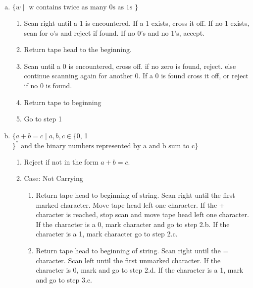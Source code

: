 ﻿\documentclass{article}
\begin{document}
\begin{enumerate}[a)]

\item $\{w \;|\; \text{ w contains twice as many 0s as 1s } \}$

\begin{enumerate}[1)]
\item Scan right until a 1 is encountered. If a 1 exists, cross it off. If no 1 exists, scan for o's and reject if found. If no 0's and no 1's, accept.
\item Return tape head to the beginning.
\item Scan until a 0 is encountered, cross off. if no zero is found, reject. else continue scanning again for another 0. If a 0 is found cross it off, or reject if no 0 is found.
\item Return tape to beginning
\item Go to step 1
\end{enumerate}

\item  $\{a + b = c \;|\; a, b, c \in $\{0, 1$\}^* \text{ and the binary numbers represented by a and b sum to c} \}$

\begin{enumerate}[1)]

\item Reject if not in the form $a + b = c$.



\item Case: Not Carrying

    \begin{enumerate}[(2.a)]
    
    \item Return tape head to beginning of string. Scan right until the first marked character. Move tape head left one character. If the + character is reached, stop scan and move tape head left one character. If the character is a 0, mark character and go to step 2.b. If the character is a 1, mark character go to step 2.c.
    
    \item Return tape head to beginning of string. Scan right until the = character. Scan left until the first unmarked character. If the character is 0, mark and go to step 2.d.  If the character is a 1, mark and go to step 3.e.
    

\end{enumerate}
\end{enumerate}
\end{enumerate}
\end{document}
